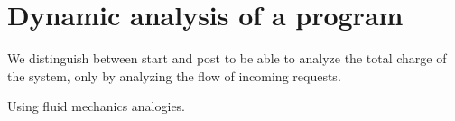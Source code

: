 \section{Dynamic analysis of a program}

We distinguish between start and post to be able to analyze the total charge of the system, only by analyzing the flow of incoming requests.

Using fluid mechanics analogies.

